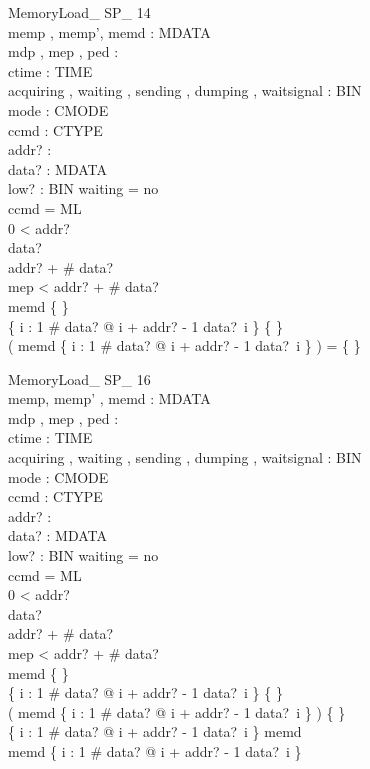 \begin{schema}{MemoryLoad\_ SP\_ 14}\\
 memp , memp', memd : \seq MDATA \\
 mdp , mep , ped : \nat \\
 ctime : TIME \\
 acquiring , waiting , sending , dumping , waitsignal : BIN \\
 mode : CMODE \\
 ccmd : CTYPE \\
 addr? : \nat \\
 data? : \seq MDATA \\
 low? : BIN 
\where
 waiting = no \\
 ccmd = ML \\
 0 < addr? \\
 data? \neq \langle \rangle \\
 addr? + \# data?  \\
 mep < addr? + \# data? \\
 memd \neq \{ \} \\
 \{ i : 1 \upto \# data? @ i + addr? - 1 \mapsto data?~i \} \neq \{ \} \\
 ( \dom memd \cap \dom \{ i : 1 \upto \# data? @ i + addr? - 1 \mapsto data?~i \} ) = \{ \}
\end{schema}


\begin{schema}{MemoryLoad\_ SP\_ 16}\\
 memp, memp' , memd : \seq MDATA \\
 mdp , mep , ped : \nat \\
 ctime : TIME \\
 acquiring , waiting , sending , dumping , waitsignal : BIN \\
 mode : CMODE \\
 ccmd : CTYPE \\
 addr? : \nat \\
 data? : \seq MDATA \\
 low? : BIN 
\where
 waiting = no \\
 ccmd = ML \\
 0 < addr? \\
 data? \neq \langle \rangle \\
 addr? + \# data?  \\
 mep < addr? + \# data? \\
 memd \neq \{ \} \\
 \{ i : 1 \upto \# data? @ i + addr? - 1 \mapsto data?~i \} \neq \{ \} \\
 ( \dom memd \cap \dom \{ i : 1 \upto \# data? @ i + addr? - 1 \mapsto data?~i \} ) \neq \{ \} \\
 \lnot \dom \{ i : 1 \upto \# data? @ i + addr? - 1 \mapsto data?~i \} \subseteq \dom memd \\
 \lnot \dom memd \subseteq \dom \{ i : 1 \upto \# data? @ i + addr? - 1 \mapsto data?~i \}
\end{schema}


